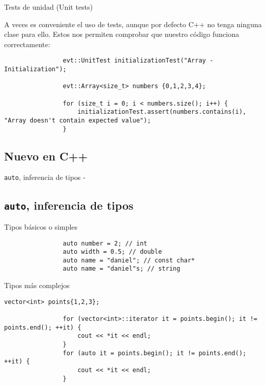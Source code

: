 \documentclass{beamer}
\newcommand{\normalSizeItem}[1] {
  \normalsize{\item #1}
}
\newcommand{\newFrameWithoutIndex}[1]{
	\begin{frame}
		#1
		\thispagestyle{empty}
	\end{frame}
}
\newcommand{\newSectionWithoutIndex}[1]{
	\newFrameWithoutIndex{\section{#1}}
}
\newcommand{\smallCite}[1]{
	\begin{small}
		\cite{#1}	
	\end{small}
}
\begin{document}
		\begin{frame}[fragile]{Tests de unidad (Unit tests)}	
			
			A veces es conveniente el uso de tests, aunque por defecto C++ no tenga ninguna clase para ello. Estos nos permiten comprobar que nuestro código funciona correctamente:

			\begin{lstlisting}
				evt::UnitTest initializationTest("Array - Initialization");
			
				evt::Array<size_t> numbers {0,1,2,3,4};
				
				for (size_t i = 0; i < numbers.size(); i++) {
					initializationTest.assert(numbers.contains(i), "Array doesn't contain expected value");
				}
				\end{lstlisting}
		\end{frame}
		
		\newSectionWithoutIndex{Nuevo en C++}	
		
		\begin{frame}[fragile]{\texttt{auto}, inferencia de tipos -\smallCite{cppReference}}\subsection{\texttt{auto}, inferencia de tipos}	
			\begin{itemize}
			
				\normalSizeItem{Tipos básicos o simples}
				\begin{lstlisting}
				auto number = 2; // int
				auto width = 0.5; // double
				auto name = "daniel"; // const char*
				auto name = "daniel"s; // string
				\end{lstlisting}
				
				\normalSizeItem{Tipos más complejos}
				\begin{lstlisting}[basicstyle={\tiny\ttfamily}]
				vector<int> points{1,2,3};
				
				for (vector<int>::iterator it = points.begin(); it != points.end(); ++it) {
					cout << *it << endl;
				}
				for (auto it = points.begin(); it != points.end(); ++it) {
					cout << *it << endl;
				}
				\end{lstlisting}
				
			\end{itemize}
		\end{frame}
		
\end{document}
